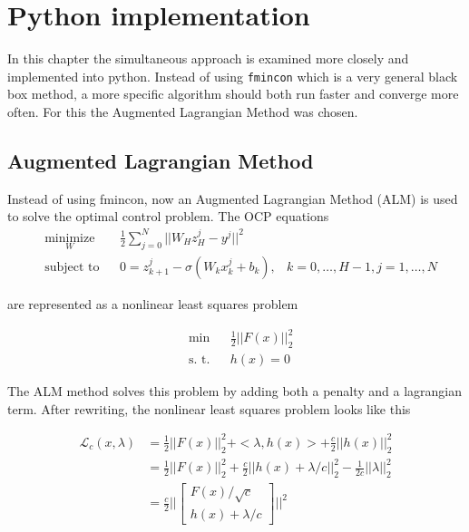 \chapter{Python implementation}
\label{cha:2}
In this chapter the simultaneous approach is examined more closely and implemented into python. Instead of using \texttt{fmincon} which is a very general black box method, a more specific algorithm should both run faster and converge more often. For this the Augmented Lagrangian Method was chosen.

\section{Augmented Lagrangian Method}
Instead of using fmincon, now an Augmented Lagrangian Method (ALM) is used to solve the optimal control problem. The OCP equations
\begin{equation*}
	\begin{aligned}
	& \underset{W}{\text{minimize}}
	& & \frac{1}{2}\sum\limits_{j=0}^{N}||W_Hz_H^j - y^j||^2 \\
	& \text{subject to}
	& & 0  = z_{k+1}^j - \sigma(W_kx_k^j + b_k), &k = 0,\ldots,H-1,j = 1,\ldots,N
	\end{aligned}
\end{equation*}

are represented as a nonlinear least squares problem

\begin{equation*}
	\begin{aligned}
	& \text{min}
	&  & \frac{1}{2} ||F(x)||^2_2 \\
	& \text{s. t.}
	& &  h(x) = 0
	\end{aligned}
\end{equation*}

The ALM method solves this problem by adding both a penalty and a lagrangian term. After rewriting, the nonlinear least squares problem looks like this

\begin{equation}
	\begin{aligned}
		\mathcal{L}_c(x,\lambda)
		&= \frac{1}{2} ||F(x)||^2_2 + <\lambda,h(x)> + \frac{c}{2} || h(x) ||^2_2 \\
		&= \frac{1}{2} ||F(x)||^2_2 + \frac{c}{2} ||h(x) + \lambda/c ||^2_2 - \frac{1}{2c} ||\lambda||^2_2 \\
		&= \frac{c}{2} \Big|\Big|
		\begin{bmatrix}
			F(x)/\sqrt{c} \\
			h(x) + \lambda/c
		\end{bmatrix} \Big|\Big|^2
	\end{aligned}
	\label{loss}
\end{equation}

